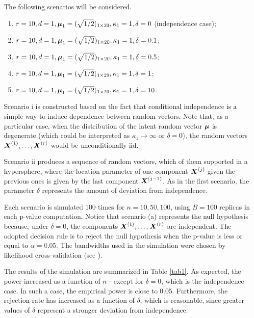 \documentclass{article}
\begin{document}
\begin{enumerate}
    The following scenarios will be considered.
    \begin{enumerate}
        \item $r=10, d=1, \boldsymbol\mu_1 = (\sqrt{1/2})_{1 \times 20}, \kappa_1 = 1, \delta = 0$ (independence case);
        \item $r=10, d=1, \boldsymbol\mu_1 = (\sqrt{1/2})_{1 \times 20}, \kappa_1 = 1, \delta = 0.1$;
        \item $r=10, d=1, \boldsymbol\mu_1 = (\sqrt{1/2})_{1 \times 20}, \kappa_1 = 1, \delta = 0.5$;
        \item $r=10, d=1, \boldsymbol\mu_1 = (\sqrt{1/2})_{1 \times 20}, \kappa_1 = 1, \delta = 1$;
        \item $r=10, d=1, \boldsymbol\mu_1 = (\sqrt{1/2})_{1 \times 20}, \kappa_1 = 1, \delta = 10$.
    \end{enumerate}
\end{enumerate}

Scenario i is constructed based on the fact that conditional independence is a simple way to induce dependence between random vectors. Note that, as a particular case, when the distribution of the latent random vector $\boldsymbol\mu$ is degenerate (which could be interpreted as $\kappa_1 \to \infty$ or $\delta = 0$), the random vectors $\boldsymbol{X}^{(1)}, \dots, \boldsymbol{X}^{(r)}$ would be unconditionally iid.

Scenario ii produces a sequence of random vectors, which of them supported in a hypersphere, where the location parameter of one component $\boldsymbol{X}^{(j)}$ given the previous ones is given by the last component $\boldsymbol{X}^{(j-1)}$. As in the first scenario, the parameter $\delta$ represents the amount of deviation from independence.

Each scenario is simulated $100$ times for $n = 10, 50, 100$, using $B=100$ replicas in each p-value computation. Notice that scenario (a) represents the null hypothesis because, under $\delta = 0$, the components $\boldsymbol{X}^{(1)}, \dots, \boldsymbol{X}^{(r)}$ are independent. The adopted decision rule is to reject the null hypothesis when the p-value is less or equal to $\alpha = 0.05$. The bandwidths used in the simulation were chosen by likelihood cross-validation (see \cite{Hall1987}).

The results of the simulation are summarized in Table \ref{tab1}. As expected, the power increased as a function of $n$ - except for $\delta = 0$, which is the independence case. In such a case, the empirical power is close to 0.05. Furthermore, the rejection rate has increased as a function of $\delta$, which is reasonable, since greater values of $\delta$ represent a stronger deviation from independence.
\end{document}

